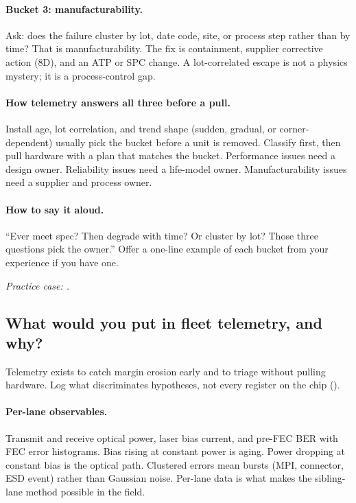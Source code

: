 \paragraph{Bucket 3: manufacturability.}
Ask: does the failure cluster by lot, date code, site, or process step
rather than by time? That is manufacturability. The fix is containment,
supplier corrective action (8D), and an ATP
or SPC change. A lot-correlated escape is not a physics
mystery; it is a process-control gap.

\paragraph{How telemetry answers all three before a pull.}
Install age, lot correlation, and trend shape (sudden, gradual, or corner-
dependent) usually pick the bucket before a unit is removed. Classify first,
then pull hardware with a plan that matches the bucket. Performance issues
need a design owner. Reliability issues need a life-model owner.
Manufacturability issues need a supplier and process owner.

\paragraph{How to say it aloud.}
``Ever meet spec? Then degrade with time? Or cluster by lot? Those three
questions pick the owner.'' Offer a one-line example of each bucket from
your experience if you have one.


\noindent\textit{Practice case: .}
\subsection{What would you put in fleet telemetry, and why?}
\label{sec:interview-worked-telemetry}

Telemetry exists to catch margin erosion early and to triage without pulling
hardware. Log what discriminates hypotheses, not every register on the chip
().

\paragraph{Per-lane observables.}
Transmit and receive optical power, laser bias current, and pre-FEC
BER with FEC error histograms. Bias rising at
constant power is aging. Power dropping at constant bias is the optical path.
Clustered errors mean bursts (MPI, connector, ESD event)
rather than Gaussian noise. Per-lane data is what makes the sibling-lane
method possible in the field.

